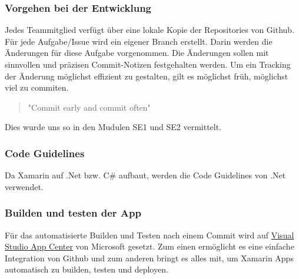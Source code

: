 \subsubsection*{Vorgehen bei der Entwicklung}
Jedes Teammitglied verfügt über eine lokale Kopie der Repositories von Github. Für jede Aufgabe/Issue wird ein eigener Branch erstellt. Darin werden die Änderungen für diese Aufgabe vorgenommen. Die Änderungen sollen mit sinnvollen und präzisen Commit-Notizen festgehalten werden. Um ein Tracking der Änderung möglichst effizient zu gestalten, gilt es möglichst früh, möglichst viel zu commiten.

\begin{quote}
	"Commit early and commit often"    
\end{quote}

Dies wurde uns so in den Mudulen SE1 und SE2 vermittelt.

\subsubsection*{Code Guidelines}
Da Xamarin auf .Net bzw. C\# aufbaut, werden die Code Guidelines von .Net verwendet. \cite{guidelines-DotNet}

\subsubsection*{Builden und testen der App}
Für das automatisierte Builden und Testen nach einem Commit wird auf \href{https://appcenter.ms/orgs/BrainingOutOfBox/apps/BrainingOutOfBox-App}{Visual Studio App Center} von Microsoft gesetzt. Zum einen ermöglicht es eine einfache Integration von Github und zum anderen bringt es alles mit, um Xamarin Apps automatisch zu builden, testen und deployen. 

